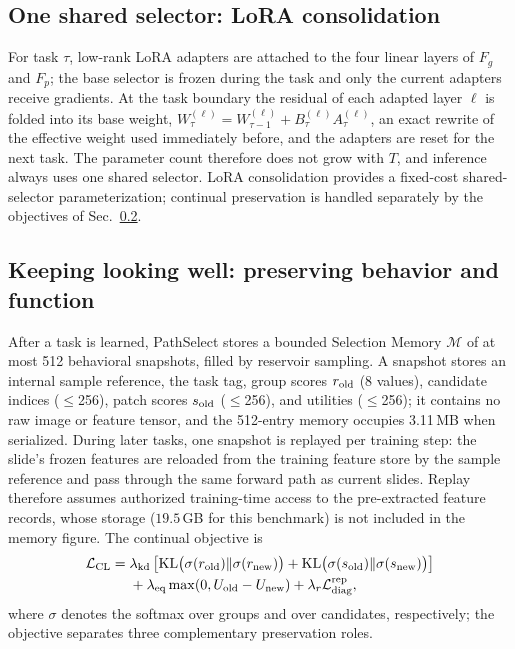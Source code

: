 \documentclass{article}
\def\L{{\cal L}}
\newcommand{\Fg}{F_g}
\newcommand{\Fp}{F_p}
\newcommand{\Mem}{\mathcal{M}}
\begin{document}
\subsection{One shared selector: LoRA consolidation}
\label{ssec:lora}

For task $\tau$, low-rank LoRA adapters are attached to the four linear layers of $\Fg$ and $\Fp$; the base selector is frozen during the task and only the current adapters receive gradients. At the task boundary the residual of each adapted layer $\ell$ is folded into its base weight, $W^{(\ell)}_{\tau}=W^{(\ell)}_{\tau-1}+B^{(\ell)}_\tau A^{(\ell)}_\tau$, an exact rewrite of the effective weight used immediately before, and the adapters are reset for the next task. The parameter count therefore does not grow with $T$, and inference always uses one shared selector. LoRA consolidation provides a fixed-cost shared-selector parameterization; continual preservation is handled separately by the objectives of Sec.~\ref{ssec:cl}.

\subsection{Keeping looking well: preserving behavior and function}
\label{ssec:cl}

After a task is learned, PathSelect stores a bounded Selection Memory $\Mem$ of at most 512 behavioral snapshots, filled by reservoir sampling. A snapshot stores an internal sample reference, the task tag, group scores $r_{\rm old}$ (8 values), candidate indices ($\le$256), patch scores $s_{\rm old}$ ($\le$256), and utilities ($\le$256); it contains no raw image or feature tensor, and the 512-entry memory occupies 3.11\,MB when serialized. During later tasks, one snapshot is replayed per training step: the slide's frozen features are reloaded from the training feature store by the sample reference and pass through the same forward path as current slides. Replay therefore assumes authorized training-time access to the pre-extracted feature records, whose storage ($19.5$\,GB for this benchmark) is not included in the memory figure. The continual objective is
\begin{align}
\L_{\mathrm{CL}}
={}&
\lambda_{\mathrm{kd}}
\left[
\mathrm{KL}\bigl(\sigma(r_{\mathrm{old}})\Vert \sigma(r_{\mathrm{new}})\bigr)
+
\mathrm{KL}\bigl(\sigma(s_{\mathrm{old}})\Vert \sigma(s_{\mathrm{new}})\bigr)
\right]
\nonumber\\
&+
\lambda_{\mathrm{eq}}
\max(0,U_{\mathrm{old}}-U_{\mathrm{new}})
+
\lambda_r \L_{\mathrm{diag}}^{\mathrm{rep}},
\label{eq:lcl}
\end{align}
where $\sigma$ denotes the softmax over groups and over candidates, respectively; the objective separates three complementary preservation roles.
\end{document}
